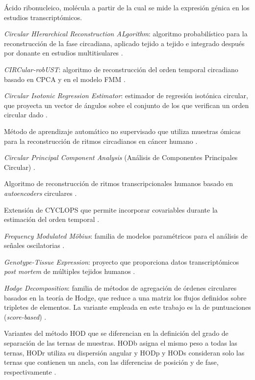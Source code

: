 \documentclass[12pt, a4paper]{report}
\begin{document}
\begin{description}[leftmargin=2.4cm, style=nextline]
\item[ARN] Ácido ribonucleico, molécula a partir de la cual se mide la expresión génica en los estudios transcriptómicos.
\item[CHIRAL] \emph{Circular HIerarchical Reconstruction ALgorithm}: algoritmo probabilístico para la reconstrucción de la fase circadiana, aplicado tejido a tejido e integrado después por donante en estudios multitisulares \cite{talamanca2023, chiral2020}.
\item[CIRCUST] \emph{CIRCular-robUST}: algoritmo de reconstrucción del orden temporal circadiano basado en CPCA y en el modelo FMM \cite{larriba2023}.
\item[CIRE] \emph{Circular Isotonic Regression Estimator}: estimador de regresión isotónica circular, que proyecta un vector de ángulos sobre el conjunto de los que verifican un orden circular dado \cite{rueda2009cire}.
\item[COFE] Método de aprendizaje automático no supervisado que utiliza muestras ómicas para la reconstrucción de ritmos circadianos en cáncer humano \cite{cofe}.
\item[CPCA] \emph{Circular Principal Component Analysis} (Análisis de Componentes Principales Circular) \cite{CPCAKirby, scholz2007}.
\item[CYCLOPS] Algoritmo de reconstrucción de ritmos transcripcionales humanos basado en \emph{autoencoders} circulares \cite{CYCLOPS}.
\item[CYCLOPS 2.0] Extensión de CYCLOPS que permite incorporar covariables durante la estimación del orden temporal \cite{CYCLOPS2}.
\item[FMM] \emph{Frequency Modulated Möbius}: familia de modelos paramétricos para el análisis de señales oscilatorias \cite{fmmAlgorithm}.
\item[GTEx] \emph{Genotype-Tissue Expression}: proyecto que proporciona datos transcriptómicos \emph{post mortem} de múltiples tejidos humanos \cite{gtex2020}.
\item[HOD] \emph{Hodge Decomposition}: familia de métodos de agregación de órdenes circulares basados en la teoría de Hodge, que reduce a una matriz los flujos definidos sobre tripletes de elementos. La variante empleada en este trabajo es la de puntuaciones (\emph{score-based}) \cite{barragan2015}.
\item[HODb, HODr, HODp, HODs] Variantes del método HOD que se diferencian en la definición del grado de separación de las ternas de muestras. HODb asigna el mismo peso a todas las ternas, HODr utiliza su dispersión angular y HODp y HODs consideran solo las ternas que contienen un ancla, con las diferencias de posición y de fase, respectivamente \cite{barragan2015}.

\end{description}
\end{document}
